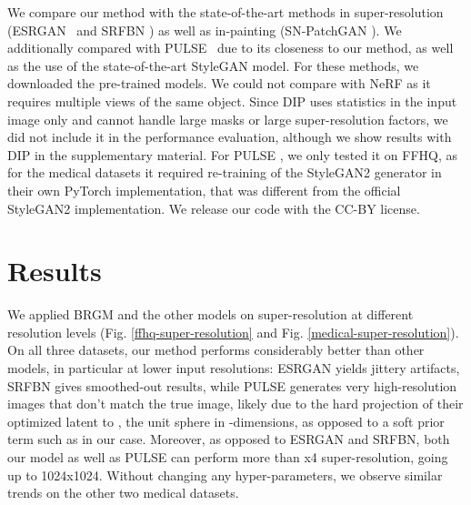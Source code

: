 \documentclass{article}
\newcommand{\fld}{results}
\newcommand{\valid}{validation}
\newcommand{\pulse}{PULSE \cite{menon2020pulse}}
\newcommand{\esrgan}{ESRGAN \cite{wang2018esrgan}}
\newcommand{\srfbn}{SRFBN \cite{li2019feedback}}
\newcommand{\patchgan}{SN-PatchGAN \cite{yu2019free}}
\begin{document}
We compare our method with the state-of-the-art methods in super-resolution (\esrgan\ and \srfbn) as well as in-painting (\patchgan). We additionally compared with \pulse\ due to its closeness to our method, as well as the use of the state-of-the-art StyleGAN model. For these methods, we downloaded the pre-trained models. We could not compare with NeRF \cite{mildenhall2020nerf} as it requires multiple views of the same object. Since DIP \cite{ulyanov2018deep} uses statistics in the input image only and cannot handle large masks or large super-resolution factors, we did not include it in the performance evaluation, although we show results with DIP in the supplementary material. For \pulse, we only tested it on FFHQ, as for the medical datasets it required re-training of the StyleGAN2 generator in their own PyTorch implementation, that was different from the official StyleGAN2 implementation. We release our code with the CC-BY license.

\section{Results}




We applied BRGM and the other models on super-resolution at different resolution levels (Fig. \ref{ffhq-super-resolution} and Fig. \ref{medical-super-resolution}). On all three datasets, our method performs considerably better than other models, in particular at lower input resolutions: ESRGAN yields jittery artifacts, SRFBN gives smoothed-out results, while PULSE generates very high-resolution images that don't match the true image, likely due to the hard projection of their optimized latent to , the unit sphere in -dimensions, as opposed to a soft prior term such as  in our case. Moreover, as opposed to ESRGAN and SRFBN, both our model as well as PULSE can perform more than x4 super-resolution, going up to 1024x1024. Without changing any hyper-parameters, we observe similar trends on the other two medical datasets. 




\newcommand{\inFH}[1]{\fld/00636-recon-real-imagesffhq_test-inpaint-arbitrary/image#1-true} \newcommand{\inFM}[1]{masks/image#1-merged} \newcommand{\inFP}[1]{\valid/inpaint-sn-patchgan/output/ffhq/image#1} \newcommand{\inFD}[1]{validation/dip/output/ffhq_arbitrary/image#1_6000} \newcommand{\inFO}[1]{\fld/00636-recon-real-imagesffhq_test-inpaint-arbitrary/inpaint/image#1} 

\newcommand{\inFEH}[1]{\fld/00700-recon-real-imagesffhq_test-inpaint-eval/image#1-true} \newcommand{\inFEM}[1]{\fld/00700-recon-real-imagesffhq_test-inpaint-eval/image#1-target} \newcommand{\inFEP}[1]{\valid/inpaint-sn-patchgan/output/ffhq_eval/image#1} \newcommand{\inFED}[1]{validation/dip/output/ffhq/image#1_6000} \newcommand{\inFEO}[1]{\fld/00700-recon-real-imagesffhq_test-inpaint-eval/inpaint/image#1} 
\end{document}
